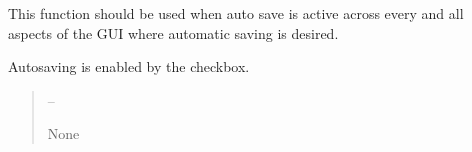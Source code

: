 \documentclass[letterpaper,11pt,english]{sphinxmanual}
\begin{document}
\begin{savenotes}
\begin{fulllineitems}
\begin{savenotes}
\begin{fulllineitems}
\end{fulllineitems}\end{savenotes}


\begin{savenotes}\begin{fulllineitems}
\label{\detokenize{code/opihiexarata.gui.manual:opihiexarata.gui.manual.OpihiManualWindow.save_auto_save}}
\pysigstartsignatures
{}
\pysigstopsignatures
\sphinxAtStartPar
This function should be used when auto save is active across
every and all aspects of the GUI where automatic saving is desired.

\sphinxAtStartPar
Auto\sphinxhyphen{}saving is enabled by the checkbox.
\begin{quote}\begin{description}
\sphinxAtStartPar
{} – 

\sphinxAtStartPar
None

\end{description}\end{quote}

\end{fulllineitems}\end{savenotes}


\begin{savenotes}\begin{fulllineitems}
\label{\detokenize{code/opihiexarata.gui.manual:opihiexarata.gui.manual.OpihiManualWindow.staticMetaObject}}
\pysigstartsignatures
{}
\pysigstopsignatures
\end{fulllineitems}\end{savenotes}


\end{fulllineitems}\end{savenotes}
\end{document}
